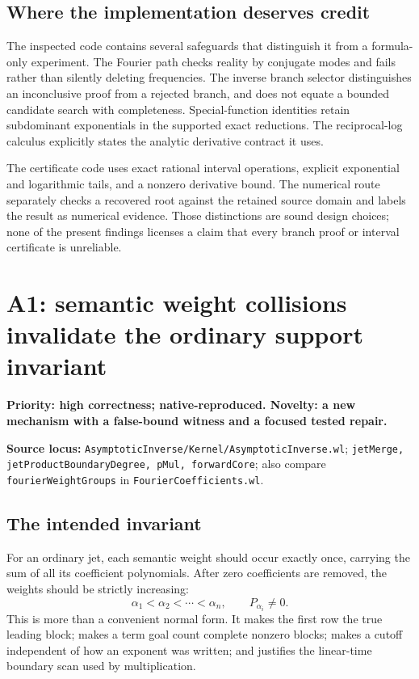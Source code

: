 \documentclass[11pt,letterpaper]{article}
\newcommand{\code}[1]{{\small\nolinkurl{#1}}}
\newcommand{\source}[2]{\textbf{Source locus:} \code{#1}; \code{#2}}
\begin{document}
\subsection{Where the implementation deserves credit}
The inspected code contains several safeguards that distinguish it from a formula-only experiment. The Fourier path checks reality by conjugate modes and fails rather than silently deleting frequencies. The inverse branch selector distinguishes an inconclusive proof from a rejected branch, and does not equate a bounded candidate search with completeness. Special-function identities retain subdominant exponentials in the supported exact reductions. The reciprocal-log calculus explicitly states the analytic derivative contract it uses.\cite{fourier,branches,identities,reciprocal}

The certificate code uses exact rational interval operations, explicit exponential and logarithmic tails, and a nonzero derivative bound. The numerical route separately checks a recovered root against the retained source domain and labels the result as numerical evidence. Those distinctions are sound design choices; none of the present findings licenses a claim that every branch proof or interval certificate is unreliable.\cite{certificates,numerical}

\section{A1: semantic weight collisions invalidate the ordinary support invariant}
\label{sec:a1}
\textbf{Priority: high correctness; native-reproduced. Novelty: a new mechanism with a false-bound witness and a focused tested repair.}

\source{AsymptoticInverse/Kernel/AsymptoticInverse.wl}{jetMerge, jetProductBoundaryDegree, pMul, forwardCore}; also compare \code{fourierWeightGroups} in \code{FourierCoefficients.wl}.\cite{core,fourier}

\subsection{The intended invariant}
For an ordinary jet, each semantic weight should occur exactly once, carrying the sum of all its coefficient polynomials. After zero coefficients are removed, the weights should be strictly increasing:
\begin{equation}
 \alpha_1<\alpha_2<\cdots<\alpha_n,\qquad P_{\alpha_i}\ne0.
 \label{eq:invariant}
\end{equation}
This is more than a convenient normal form. It makes the first row the true leading block; makes a term goal count complete nonzero blocks; makes a cutoff independent of how an exponent was written; and justifies the linear-time boundary scan used by multiplication.
\end{document}
